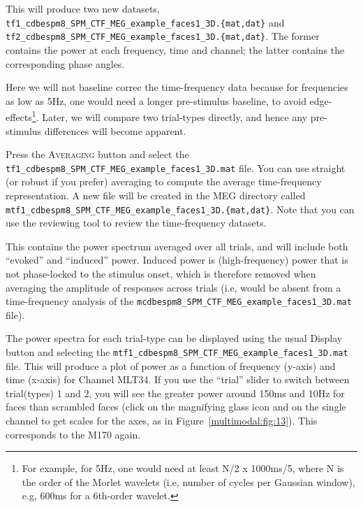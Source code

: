 This will produce two new datasets, \texttt{tf1\_\-cdbespm8\_\-SPM\_\-CTF\_\-MEG\_\-example\_\-faces1\_3D.\{mat,dat\}} and  \texttt{tf2\_\-cdbespm8\_\-SPM\_\-CTF\_\-MEG\_\-example\_\-faces1\_\-3D.\{mat,dat\}}. The former contains the power at each frequency, time and channel; the latter contains the corresponding phase angles.

Here we will not baseline correc the time-frequency data because for frequencies as low as 5Hz, one would need a longer pre-stimulus baseline, to avoid edge-effects\footnote{For example, for 5Hz, one would need at least N/2 x 1000ms/5, where N is the order of the Morlet wavelets (i.e, number of cycles per Gaussian window), e.g, 600ms for a 6th-order wavelet.}. Later, we will compare two trial-types directly, and hence any pre-stimulus differences will become apparent. 

Press the \textsc{Averaging} button and select the \texttt{tf1\_\-cdbespm8\_\-SPM\_\-CTF\_\-MEG\_\-example\_\-faces1\_\-3D.mat} file. You can use straight (or robust if you prefer) averaging to compute the average time-frequency representation. A new file will be created in the MEG directory called \texttt{mtf1\_cdbespm8\_\-SPM\_\-CTF\_\-MEG\_\-example\_\-faces1\_\-3D.\{mat,dat\}}. Note that you can use the reviewing tool to review the time-frequency datasets.

This contains the power spectrum averaged over all trials, and will include both ``evoked'' and ``induced'' power. Induced power is (high-frequency) power that is not phase-locked to the stimulus onset, which is therefore removed when averaging the amplitude of responses across trials (i.e, would be absent from a time-frequency analysis of the \texttt{mcdbespm8\_SPM\_\-CTF\_\-MEG\_\-example\_\-faces1\_\-3D.mat} file).

The power spectra for each trial-type can be displayed using the usual Display button and selecting the \texttt{mtf1\_\-cdbespm8\_\-SPM\_\-CTF\_\-MEG\_\-example\_\-faces1\_3D.mat} file. This will produce a plot of power as a function of frequency (y-axis) and time (x-axis) for Channel MLT34. If you use the ``trial'' slider to switch between trial(types) 1 and 2, you will see the greater power around 150ms and 10Hz for faces than scrambled faces (click on the magnifying glass icon and on the single channel to get scales for the axes, as in Figure~\ref{multimodal:fig:13}). This corresponds to the M170 again.

